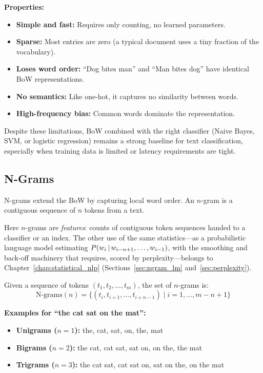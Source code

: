 \textbf{Properties:}
\begin{itemize}
    \item \textbf{Simple and fast:} Requires only counting, no learned parameters.
    \item \textbf{Sparse:} Most entries are zero (a typical document uses a tiny fraction
    of the vocabulary).
    \item \textbf{Loses word order:} ``Dog bites man'' and ``Man bites dog'' have identical
    BoW representations.
    \item \textbf{No semantics:} Like one-hot, it captures no similarity between words.
    \item \textbf{High-frequency bias:} Common words dominate the representation.
\end{itemize}

Despite these limitations, BoW combined with the right classifier (Naive Bayes, SVM, or
logistic regression) remains a strong baseline for text classification, especially when
training data is limited or latency requirements are tight.

\subsection{N-Grams}
\label{sec:ngrams}

N-grams extend the BoW by capturing local word order. An $n$-gram is a contiguous
sequence of $n$ tokens from a text.

Here $n$-grams are \emph{features}: counts of contiguous token sequences handed to a
classifier or an index. The other use of the same statistics---as a probabilistic language
model estimating $P(w_i \,|\, w_{i-n+1}, \ldots, w_{i-1})$, with the smoothing and
back-off machinery that requires, scored by perplexity---belongs to
Chapter~\ref{chap:statistical_nlp} (Sections~\ref{sec:ngram_lm} and~\ref{sec:perplexity}).

\begin{definition}[N-Gram]
Given a sequence of tokens $(t_1, t_2, \ldots, t_m)$, the set of $n$-grams is:
\begin{equation}
    \text{N-grams}(n) = \{(t_i, t_{i+1}, \ldots, t_{i+n-1}) \mid i = 1, \ldots, m - n + 1\}
\end{equation}
\end{definition}

\textbf{Examples for ``the cat sat on the mat'':}
\begin{itemize}
    \item \textbf{Unigrams ($n=1$):} the, cat, sat, on, the, mat
    \item \textbf{Bigrams ($n=2$):} the cat, cat sat, sat on, on the, the mat
    \item \textbf{Trigrams ($n=3$):} the cat sat, cat sat on, sat on the, on the mat
\end{itemize}

